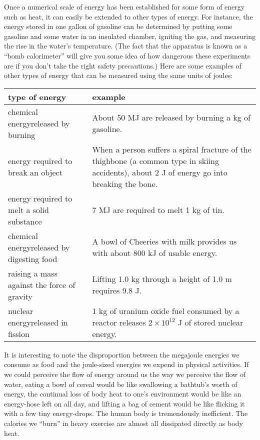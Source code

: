 Once a numerical scale of energy has been established for
some form of energy such as heat, it can easily be extended
to other types of energy. For instance, the energy stored in
one gallon of gasoline can be determined by putting some
gasoline and some water in an insulated chamber, igniting
the gas, and measuring the rise in the water's temperature.
(The fact that the apparatus is known as a ``bomb calorimeter''
will give you some idea of how dangerous these experiments
are if you don't take the right safety precautions.) Here
are some examples of other types of energy that can be
measured using the same units of joules:

\begin{tabular}{|p{38mm}p{62mm}|}\hline
\textbf{type of energy} & \textbf{example} \\ \hline
chemical energy\linebreak[4] released by burning & About 50 MJ are released by burning a kg of gasoline. \\ \hline
energy required to break an object & When a person suffers a spiral fracture of the thighbone (a common
type in skiing accidents), about 2 J of energy go into breaking the bone. \\ \hline
energy required to melt a solid substance & 7 MJ are required to melt 1 kg of tin. \\ \hline
chemical energy\linebreak[4] released by digesting food & A bowl of Cheeries with milk provides us with about 800 kJ of usable energy. \\ \hline
raising a mass against the force of gravity & Lifting 1.0 kg through a height of 1.0 m requires 9.8 J. \\ \hline
nuclear energy\linebreak[4] released in fission & 1 kg of uranium oxide fuel consumed by a reactor releases $2\times10^{12}$ J of stored nuclear energy. \\ \hline
\end{tabular}

It is interesting to note the disproportion between the
megajoule energies we consume as food and the joule-sized
energies we expend in physical activities. If we could
perceive the flow of energy around us the way we perceive
the flow of water, eating a bowl of cereal would be like
swallowing a bathtub's worth of energy, the continual loss
of body heat to one's environment would be like an
energy-hose left on all day, and lifting a bag of cement
would be like flicking it with a few tiny energy-drops. The
human body is tremendously inefficient. The calories we
``burn'' in heavy exercise are almost all dissipated
directly as body heat.

